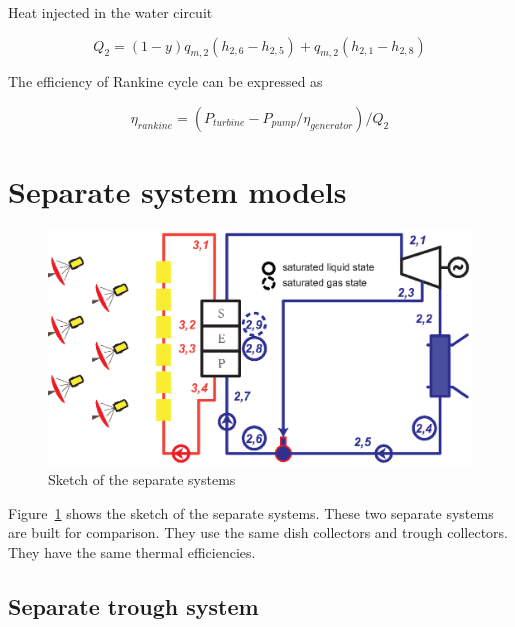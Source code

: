 \documentclass{article}
\begin{document}
Heat injected in the water circuit

\begin{equation*}
	Q_2=\left(1-y\right)q_{m,2}\left(h_{2,6}-h_{2,5}\right)+q_{m,2}\left(h_{2,1}-h_{2,8}\right)
\end{equation*}

The efficiency of Rankine cycle can be expressed as

\begin{equation*}
	\eta_{rankine}=(P_{turbine}-P_{pump}/\eta_{generator})/Q_{2}
\end{equation*}

%

\section{Separate system models}

\noindent \begin{figure}[htbp]
\begin{center}
	\includegraphics[width = 0.7\columnwidth]{./graphics/separateSystem}
	\caption{Sketch of the separate systems}
	\label{fig:System-2}
\end{center}
\end{figure}

Figure~\ref{fig:System-2} shows the sketch of the separate systems. These two separate systems are built for comparison. They use the same dish collectors and trough collectors. They have the same thermal efficiencies.

\subsection{Separate trough system}
\end{document}
